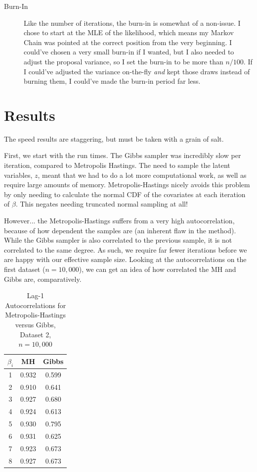 \documentclass[12pt]{article}
\begin{document}
\begin{description}
\item[Burn-In] Like the number of iterations, the burn-in is somewhat of a non-issue. I chose to start at the MLE of the likelihood, which means my Markov Chain was pointed at the correct position from the very beginning. I could've chosen a very small burn-in if I wanted, but I also needed to adjust the proposal variance, so I set the burn-in to be more than $n/100$. If I could've adjusted the variance on-the-fly \emph{and} kept those draws instead of burning them, I could've made the burn-in period far less.
\end{description}

\section{Results}
The speed results are staggering, but must be taken with a grain of salt. 

First, we start with the run times. The Gibbs sampler was incredibly slow per iteration, compared to Metropolis Hastings. The need to sample the latent variables, $z$, meant that we had to do a lot more computational work, as well as require large amounts of memory. Metropolis-Hastings nicely avoids this problem by only needing to calculate the normal CDF of the covariates at each iteration of $\beta$. This negates needing truncated normal sampling at all! 

However... the Metropolis-Hastings suffers from a very high autocorrelation, because of how dependent the samples are (an inherent flaw in the method). While the Gibbs sampler is also correlated to the previous sample, it is not correlated to the same degree. As such, we require far fewer iterations before we are happy with our effective sample size. Looking at the autocorrelations on the first dataset ($n=10,000$), we can get an idea of how correlated the MH and Gibbs are, comparatively.

\begin{table}[H] \center
\begin{tabular}{ccc} \hline
$\beta_i$ & MH & Gibbs \\ \hline
1 & 0.932 & 0.599 \\ 
2 & 0.910 & 0.641 \\ 
3 & 0.927 & 0.680 \\ 
4 & 0.924 & 0.613 \\ 
5 & 0.930 & 0.795 \\ 
6 & 0.931 & 0.625 \\ 
7 & 0.923 & 0.673 \\ 
8 & 0.927 & 0.673 \\ \hline
\end{tabular}
\caption{Lag-1 Autocorrelations for Metropolis-Hastings versus Gibbs, Dataset 2, $n=10,000$}
\end{table}
\end{document}
